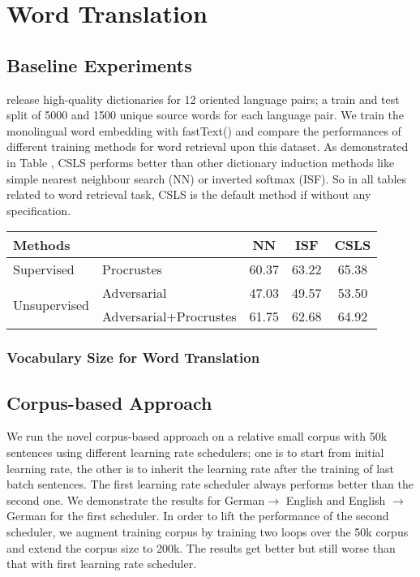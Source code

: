 \section{Word Translation}
\subsection{Baseline Experiments}
 \cite{conneau2017word} release high-quality dictionaries for 12 oriented language pairs; a train and test split of 5000 and 1500 unique source words for each language pair. We train the monolingual word embedding with fastText(\cite{bojanowski2016enriching}) and compare the performances of different training methods for word retrieval upon this dataset. As demonstrated in Table , CSLS performs better than other dictionary induction methods like simple nearest neighbour search (NN)  or inverted softmax (ISF). So in all tables related to word retrieval task, CSLS is the default method if without any specification.

\begin{table}[H]
	\centering
	\begin{tabular}{llccc}
		\hline
		\multicolumn{2}{l}{Methods}                           & NN    & ISF   & CSLS  \\ \hline
		Supervised                    & Procrustes             & 60.37 & 63.22 & 65.38 \\ \hline
		\multirow{2}{*}{Unsupervised} & Adversarial            & 47.03 & 49.57 & 53.50 \\ \cline{2-5} 
		& Adversarial+Procrustes & 61.75 & 62.68 & 64.92 \\ \hline
	\end{tabular}
\end{table}
\subsubsection{Vocabulary Size for Word Translation}


\subsection{Corpus-based Approach}
We run the novel corpus-based approach on a relative small corpus with 50k sentences using different learning rate schedulers; one is to start from initial learning rate, the other is to inherit the learning rate after the training of last batch sentences. The first learning rate scheduler always performs better than the second one. We demonstrate the results for German$\rightarrow$ English and English $\rightarrow$ German for the first scheduler. In order to lift the performance of the second scheduler, we augment training corpus by training two loops over the 50k corpus and extend the corpus size to 200k. The results get better but still worse than that with first learning rate scheduler. 

